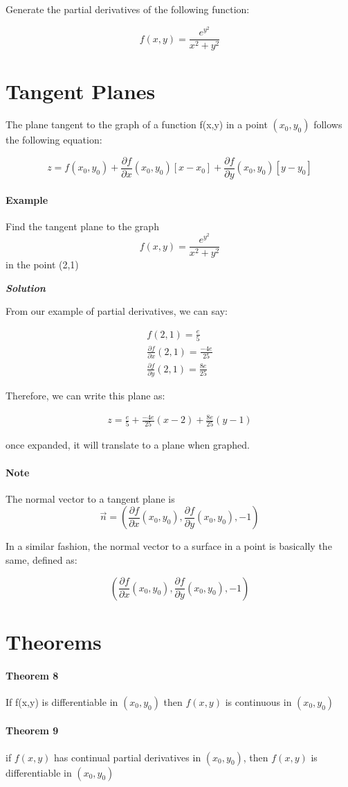 \documentclass[11pt,fleqn]{book} %
\begin{document}
Generate the partial derivatives of the following function:

$$f(x,y) = \frac{e^{y^{2}}}{x^2+y^2}$$

\section{Tangent Planes}

The plane tangent to the graph of a function f(x,y) in a point $(x_0, y_0)$
follows the following equation:

$$z = f(x_0, y_0) + \frac{\partial f}{\partial x} (x_0, y_0) [x - x_0] + \frac{\partial f}{\partial y} (x_0, y_0) [y - y_0] $$

\paragraph{Example}

Find the tangent plane to the graph $$f(x,y) = \frac{e^{y^{2}}}{x^2+y^2}$$ in the point (2,1)

\textit{\textbf{Solution}}

From our example of partial derivatives, we can say:

\begin{gather}
    f(2,1) = \frac{e}{5}\\
    \frac{\partial f}{\partial x} (2,1) =  \frac{-4e}{25}\\
    \frac{\partial f}{\partial y} (2,1) =  \frac{8e}{25}
\end{gather}

Therefore, we can write this plane as:

\begin{gather}
    z = \frac{e}{5} + \frac{-4e}{25}(x - 2) + \frac{8e}{25}(y - 1)
\end{gather}

once expanded, it will translate to a plane when graphed.

\paragraph*{Note}

The normal vector to a tangent plane is $$\vec{n} = (\frac{\partial f}{\partial x} (x_0, y_0), \frac{\partial f}{\partial y} (x_0, y_0), -1)$$

In a similar fashion, the normal vector to a surface in a point is basically the same, defined as:

$$(\frac{\partial f}{\partial x} (x_0, y_0), \frac{\partial f}{\partial y} (x_0, y_0), -1)$$

\section{Theorems}

\paragraph{Theorem 8}

If f(x,y) is differentiable in $(x_0, y_0)$ then $f(x,y)$ is continuous in
$(x_0,y_0)$

\paragraph{Theorem 9}

if $f(x,y)$ has continual partial derivatives in $(x_0, y_0)$, then $f(x,y)$
is differentiable in $(x_0,y_0)$
\end{document}

